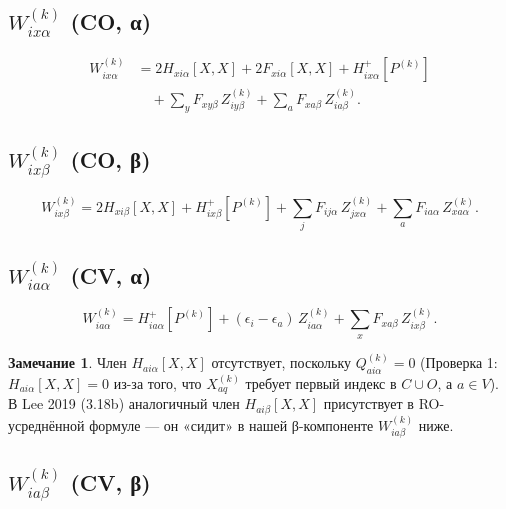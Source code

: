 \documentclass[11pt, a4paper]{article}
\theoremstyle{definition}
\newtheorem{remark}{Замечание}[section]
\newcommand{\Hp}{H^{+}}
\begin{document}
\subsection{$W^{(k)}_{ix\alpha}$ (CO, α)}

\begin{equation}
    \boxed{
    \begin{aligned}
        W^{(k)}_{ix\alpha} &= 2 H_{xi\alpha}[X, X] + 2 F_{xi\alpha}[X, X] + \Hp_{ix\alpha}[P^{(k)}] \\
        &\quad + \sum_y F_{xy\beta}\, Z^{(k)}_{iy\beta} + \sum_a F_{xa\beta}\, Z^{(k)}_{ia\beta}.
    \end{aligned}}
\end{equation}

\subsection{$W^{(k)}_{ix\beta}$ (CO, β)}

\begin{equation}
    \boxed{
        W^{(k)}_{ix\beta} = 2 H_{xi\beta}[X, X] + \Hp_{ix\beta}[P^{(k)}] + \sum_j F_{ij\alpha}\, Z^{(k)}_{jx\alpha} + \sum_a F_{ia\alpha}\, Z^{(k)}_{xa\alpha}.
    }
\end{equation}

\subsection{$W^{(k)}_{ia\alpha}$ (CV, α)}

\begin{equation}
    \boxed{
        W^{(k)}_{ia\alpha} = \Hp_{ia\alpha}[P^{(k)}] + (\epsilon_i - \epsilon_a)\, Z^{(k)}_{ia\alpha} + \sum_x F_{xa\beta}\, Z^{(k)}_{ix\beta}.
    }
\end{equation}

\begin{remark}
Член $H_{ai\alpha}[X, X]$ отсутствует, поскольку $Q^{(k)}_{ai\alpha} = 0$ (Проверка 1: $H_{ai\alpha}[X, X] = 0$ из-за того, что $X^{(k)}_{aq}$ требует первый индекс в $C \cup O$, а $a \in V$). В Lee 2019 (3.18b) аналогичный член $H_{ai\beta}[X, X]$ присутствует в RO-усреднённой формуле --- он «сидит» в нашей β-компоненте $W^{(k)}_{ia\beta}$ ниже.
\end{remark}

\subsection{$W^{(k)}_{ia\beta}$ (CV, β)}
\end{document}
